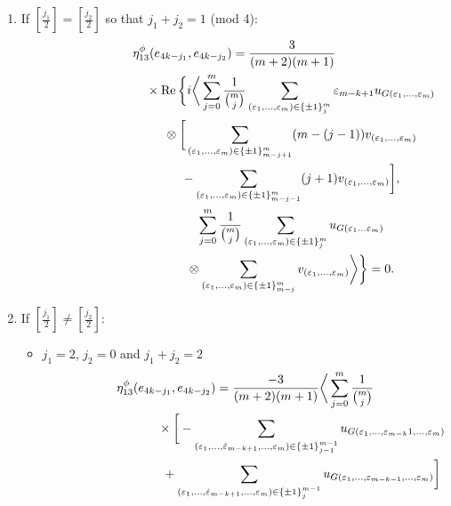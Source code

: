 \documentclass[pdftex]{sigma}
\numberwithin{equation}{section}
\begin{document}
\begin{enumerate}\itemsep=0pt\allowdisplaybreaks
\item If $[\frac{j_1}{2}]=[\frac{j_2}{2}]$ so that $j_1+j_2=1$ (mod 4):
\begin{gather*}
 \eta_{13}^\phi(e_{4k-j_1},e_{4k-j_2}) = \frac{3}{(m+2)(m+1)}\\
\hphantom{\eta_{13}^\phi(e_{4k-j_1},e_{4k-j_2}) =}{}
\times \operatorname{Re}\bigg\{ i\bigg\langle \sum_{j=0}^{m}\frac{1}{{m\choose j}}\sum_{(\varepsilon_{1},\dots,
\varepsilon_{m})\in\{\pm 1\}_{j}^{m}}\varepsilon_{m-k+1} u_{G(\varepsilon_{1}, \dots, \varepsilon_{m})}\\
\hphantom{\eta_{13}^\phi(e_{4k-j_1},e_{4k-j_2}) =}{} \otimes \bigg[ \sum_{(\varepsilon_{1},\dots ,\varepsilon_{m})\in\{\pm
1\}_{m-j+1}^{m}}(m-(j-1))v_{(\varepsilon_{1},\dots,\varepsilon_m)}\\
\hphantom{\eta_{13}^\phi(e_{4k-j_1},e_{4k-j_2}) =}{}
-\sum_{(\varepsilon_{1},\dots, \varepsilon_{m})\in\{\pm
1\}_{m-j-1}^{m}}(j+1)v_{(\varepsilon_{1},\dots,\varepsilon_m)}\bigg],\\
\hphantom{\eta_{13}^\phi(e_{4k-j_1},e_{4k-j_2}) =}{}
 \sum_{j=0}^{m}\frac{1}{{m\choose j}}\sum_{(\varepsilon_{1},\dots, \varepsilon_{m})\in\{\pm
1\}_{j}^{m}}u_{G(\varepsilon_1\dots\varepsilon_m)}\\
\hphantom{\eta_{13}^\phi(e_{4k-j_1},e_{4k-j_2}) =}{}
\otimes
\sum_{(\varepsilon_{1},\dots, \varepsilon_{m})\in\{\pm 1\}_{m-j}^{m}}v_{(\varepsilon_1,\dots,\varepsilon_m)}\bigg\rangle\bigg\} =0.
\end{gather*}
\item If $[\frac{j_1}{2}]\neq[\frac{j_2}{2}]$:
\begin{itemize}\allowdisplaybreaks\itemsep=0pt
\item[i)] $j_1=2$, $j_2=0$ and $j_1+j_2=2$
\begin{gather*}
 \eta_{13}^\phi(e_{4k-j_1},e_{4k-j_2}) =
 \frac{-3}{(m+2)(m+1)}\bigg\langle \sum_{j=0}^{m}\frac{1}{{m\choose j}}\\
\hphantom{\eta_{13}^\phi(e_{4k-j_1},e_{4k-j_2}) =}{}\times
\bigg[{} -\sum_{(\varepsilon_{1},\dots,\hat{\varepsilon}_{m-k+1},\dots, \varepsilon_{m})\in\{\pm
1\}_{j-1}^{m-1}}u_{G(\varepsilon_{1},\dots, \varepsilon_{m-k} 1,\dots,\varepsilon_{m})}\\
\hphantom{\eta_{13}^\phi(e_{4k-j_1},e_{4k-j_2}) =}{} + \sum_{(\varepsilon_{1},\dots,\hat{\varepsilon}_{m-k+1},\dots, \varepsilon_{m})\in\{\pm 1\}_{j}^{m-1}}u_{G(\varepsilon_{1},\dots,
\varepsilon_{m-k -1}, \dots,\varepsilon_{m})} \bigg]\\

\end{gather*}
\end{itemize}
\end{enumerate}
\end{document}
